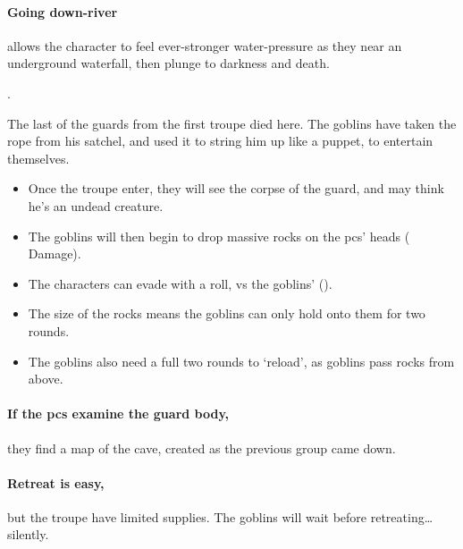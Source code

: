 \begin{multicols}{2}

\paragraph{Going down-river}
allows the character to feel ever-stronger water-pressure as they near an underground waterfall, then plunge to darkness and death.

.


\begin{exampletext}
  The last of the \glspl{guard} from the first troupe died here.
  The goblins have taken the rope from his satchel, and used it to string him up like a puppet, to entertain themselves.
\end{exampletext}

\begin{itemize}
  \item
  Once the troupe enter, they will see the corpse of the \gls{guard}, and may think he's an undead creature.
  \item
  The goblins will then begin to drop massive rocks on the \glspl{pc}' heads ( Damage).
  \item
  The characters can evade with a  roll, vs the goblins'  (\tn).
  \item
  The size of the rocks means the goblins can only hold onto them for two \glspl{round}.
  \item
  The goblins also need a full two rounds to `reload', as goblins pass rocks from above.
\end{itemize}

\paragraph{If the \glspl{pc} examine the \gls{guard} body,}
they find a map of the cave, created as the previous group came down.

\paragraph{Retreat is easy,}
but the troupe have limited supplies.
The goblins will wait  before retreating\ldots silently.


\end{multicols}
